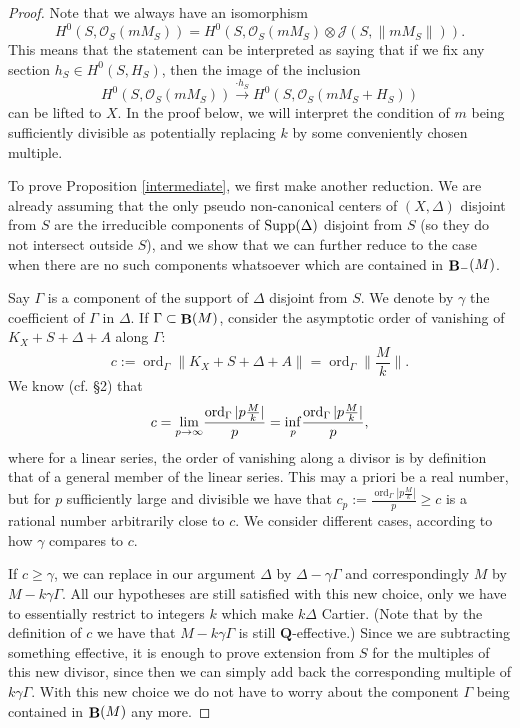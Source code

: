 \documentclass[11pt]{amsart}
\theoremstyle{plain}
\theoremstyle{definition}
\newcommand{\QQ}{\mathbf{Q}}
\newcommand{\OO}{\mathcal  {O}}
\newcommand{\JJ}{\mathcal  {J}}
\DeclareMathOperator{\ord}{ord}
\DeclareMathOperator{\BB}{{\bf B}}
\begin{document}
\begin{proof}
\noindent
Note that we always have an isomorphism 
$$H^0 (S, \OO_S(mM_S) ) =  
H^0 (S, \OO_S(mM_S) \otimes \JJ (S, \parallel mM_S\parallel ) ).$$ 
This means that the statement can be interpreted as saying that if we fix any section $h_S \in 
H^0(S, H_S)$, then the image of the inclusion 
$$H^0 (S, \OO_S(mM_S) ) \overset{\cdot h_S}{\longrightarrow} H^0 (S, \OO_S(mM_S + H_S) ) $$ 
can be lifted to $X$. In the proof below, we will interpret the condition of $m$ being sufficiently divisible 
as potentially replacing $k$ by some conveniently chosen multiple.

To prove Proposition \ref{intermediate}, we first make another reduction. We are already assuming that
the only pseudo non-canonical centers of $(X, \Delta)$ disjoint from $S$ are the irreducible components of 
$ {\rm Supp}(\Delta)$ disjoint from $S$ (so they do not intersect outside 
$S$), and we show that we can further reduce to the case when there are no such components
whatsoever which are contained in $\BB_{-} (M)$.

Say $\Gamma$ is a component of the support of $\Delta$ disjoint from $S$. We denote by $\gamma$ the coefficient of 
$\Gamma$ in $\Delta$. If $\Gamma \subset \BB (M)$, consider the asymptotic order of vanishing of $K_X + S + \Delta + A$ along $\Gamma$:
$$c:= \ord_{\Gamma} \parallel K_X + S + \Delta + A \parallel =  \ord_{\Gamma} \parallel \frac{M}{k} \parallel .$$
We know (cf. \cite{elmnp} \S2) that 
$$c = \underset{p\to \infty}{\rm lim}  \frac{\ord_{\Gamma} |p\frac{M}{k}|}{p} = 
\underset{p}{\rm inf} \frac{\ord_{\Gamma} |p\frac{M}{k}|}{p},$$
where for a linear series, the order of vanishing along a divisor is by definition that of a general member of the linear series.
This may a priori be a real number, but for $p$ sufficiently large and divisible we have that $c_p := \frac{\ord_{\Gamma} |p\frac{M}{k}|}{p} \ge c$ is a rational number arbitrarily close to $c$. We consider different cases, according to how 
$\gamma$ compares to $c$.

If $c \ge \gamma$, we can replace in our argument $\Delta$ by 
$\Delta - \gamma \Gamma$ and correspondingly $M$ by $M - k \gamma \Gamma$. All our hypotheses are still 
satisfied with this new choice, only we have to essentially restrict to integers $k$ which make $k\Delta$ Cartier. (Note that by the definition of $c$ we have that $M - k \gamma \Gamma$ is still $\QQ$-effective.) Since we are subtracting something effective, it is enough to prove extension from $S$ 
for the multiples of this new divisor, since then we can simply add back the corresponding multiple of $k \gamma \Gamma$. 
With this new choice we do not have to worry about the component $\Gamma$ being contained in $\BB (M)$ any more.


\end{proof}
\end{document}
